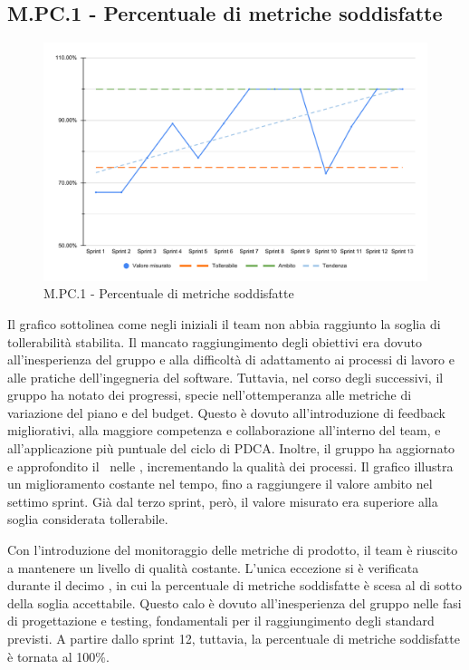 \subsection{M.PC.1 - Percentuale di metriche soddisfatte}
\begin{figure}[H]
    \centering
    \includegraphics[width=\textwidth]{assets/metriche_soddisfatte.pdf}
    \caption{M.PC.1 - Percentuale di metriche soddisfatte}
\end{figure}

\par Il grafico sottolinea come negli  iniziali il team non abbia raggiunto la soglia di tollerabilità stabilita. Il mancato raggiungimento degli obiettivi era dovuto all'inesperienza del gruppo e alla difficoltà di adattamento ai processi di lavoro e alle pratiche dell'ingegneria del software. Tuttavia, nel corso degli  successivi, il gruppo ha notato dei progressi, specie nell'ottemperanza alle metriche di variazione del piano e del budget. Questo è dovuto all'introduzione di feedback migliorativi, alla maggiore competenza e collaborazione all'interno del team, e all'applicazione più puntuale del ciclo di PDCA. Inoltre, il gruppo ha aggiornato e approfondito il \WoW\ nelle \NdP, incrementando la qualità dei processi. Il grafico illustra un miglioramento costante nel tempo, fino a raggiungere il valore ambito nel settimo sprint. Già dal terzo sprint, però, il valore misurato era superiore alla soglia considerata tollerabile. 

\par Con l'introduzione del monitoraggio delle metriche di prodotto, il team è riuscito a mantenere un livello di qualità costante. L'unica eccezione si è verificata durante il decimo , in cui la percentuale di metriche soddisfatte è scesa al di sotto della soglia accettabile. Questo calo è dovuto all'inesperienza del gruppo nelle fasi di progettazione e testing, fondamentali per il raggiungimento degli standard previsti. A partire dallo sprint 12, tuttavia, la percentuale di metriche soddisfatte è tornata al 100\%.
